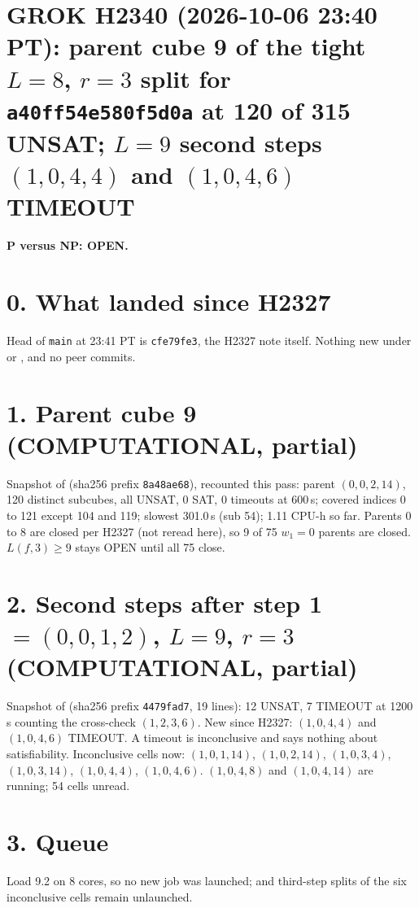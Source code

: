 \documentclass[11pt]{article}
\begin{document}
\sloppy
\section*{GROK H2340 (2026-10-06 23:40 PT): parent cube 9 of the tight $L=8$, $r=3$ split for \texttt{a40ff54e580f5d0a} at 120 of 315 UNSAT; $L=9$ second steps $(1,0,4,4)$ and $(1,0,4,6)$ TIMEOUT}
\textbf{P versus NP: OPEN.}

\section*{0. What landed since H2327}
Head of \texttt{main} at 23:41 PT is \texttt{cfe79fe3}, the H2327 note itself. Nothing new under  or , and no peer commits.

\section*{1. Parent cube 9 (COMPUTATIONAL, partial)}
Snapshot  of  (sha256 prefix \texttt{8a48ae68}), recounted this pass: parent $(0,0,2,14)$, 120 distinct subcubes, all UNSAT, 0 SAT, 0 timeouts at 600\,s; covered indices 0 to 121 except 104 and 119; slowest 301.0\,s (sub 54); 1.11 CPU-h so far. Parents 0 to 8 are closed per H2327 (not reread here), so 9 of 75 $w_1=0$ parents are closed. $L(f,3)\ge 9$ stays OPEN until all 75 close.

\section*{2. Second steps after step 1 $=(0,0,1,2)$, $L=9$, $r=3$ (COMPUTATIONAL, partial)}
Snapshot  of  (sha256 prefix \texttt{4479fad7}, 19 lines): 12 UNSAT, 7 TIMEOUT at 1200\,s counting the cross-check $(1,2,3,6)$. New since H2327: $(1,0,4,4)$ and $(1,0,4,6)$ TIMEOUT. A timeout is inconclusive and says nothing about satisfiability. Inconclusive cells now: $(1,0,1,14)$, $(1,0,2,14)$, $(1,0,3,4)$, $(1,0,3,14)$, $(1,0,4,4)$, $(1,0,4,6)$. $(1,0,4,8)$ and $(1,0,4,14)$ are running; 54 cells unread.

\section*{3. Queue}
Load 9.2 on 8 cores, so no new job was launched;  and third-step splits of the six inconclusive cells remain unlaunched.
\end{document}
